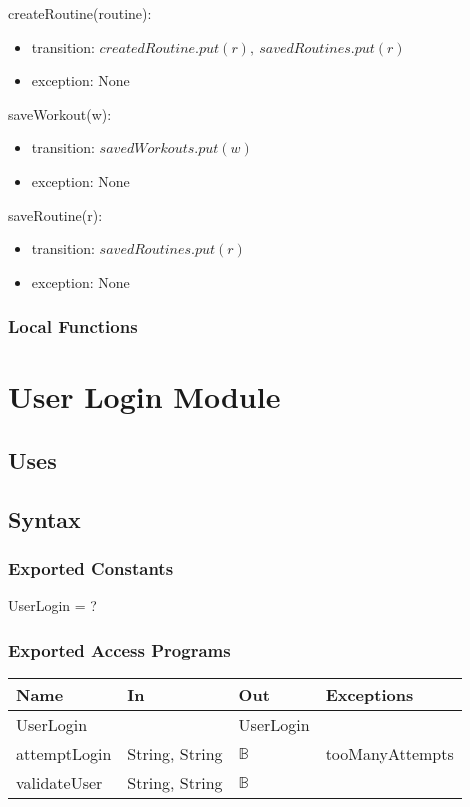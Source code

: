 \documentclass[12pt, titlepage]{article}
\begin{document}
createRoutine(routine):
\begin{itemize}
	\item transition: $ createdRoutine.put(r), \ savedRoutines.put(r) $
	\item exception: None
\end{itemize}

saveWorkout(w):
\begin{itemize}
	\item transition: $ savedWorkouts.put(w) $
	\item exception: None
\end{itemize}

saveRoutine(r):
\begin{itemize}
	\item transition: $ savedRoutines.put(r) $
	\item exception: None
\end{itemize}

\subsubsection{Local Functions}

\newpage

\section{User Login Module}

\subsection{Uses}

\subsection{Syntax}

\subsubsection{Exported Constants}
UserLogin = ?
\subsubsection{Exported Access Programs}

\begin{center}
	\begin{tabular}{p{2cm} p{4cm} p{4cm} p{2cm}}
		\hline
		\textbf{Name} & \textbf{In} & \textbf{Out} & \textbf{Exceptions} \\
		\hline
		UserLogin & & UserLogin &  \\
		attemptLogin & String, String & $\mathbb{B}$ & tooManyAttempts \\
		validateUser & String, String & $\mathbb{B}$ &  \\
		\hline
	\end{tabular}
\end{center}
\end{document}
